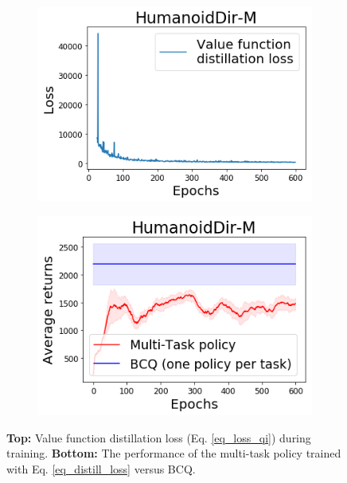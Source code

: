 \begin{figure}
    \centering
    \vspace{-0.5em}
    \begin{subfigure}{0.27\paperwidth}
        \includegraphics[width=\linewidth]{chapter_2/fig/HumanoidDir-M-neither-qloss.png}
    \end{subfigure}

    \begin{subfigure}{0.27\paperwidth}
        \includegraphics[width=\linewidth]{chapter_2/fig/HumanoidDir-M-neither-train-returns.png}
    \end{subfigure}
    \caption{{\bf Top:} Value function
        distillation
        loss (Eq. \ref{eq_loss_qi}) during training. {\bf Bottom:} The performance of the multi-task policy trained with Eq. \ref{eq_distill_loss} versus BCQ.}\label{fig:fail-distill}
\end{figure}


